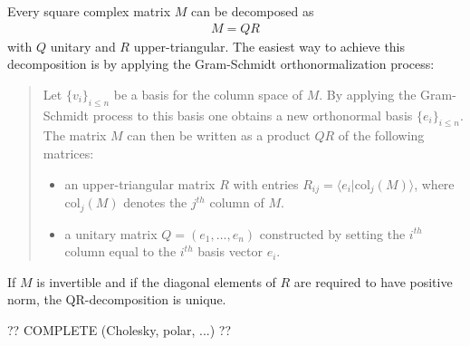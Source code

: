     \begin{method}[QR Decomposition]
        Every square complex matrix $M$ can be decomposed as
        \begin{gather}
            M = QR
        \end{gather}
        with $Q$ unitary and $R$ upper-triangular. The easiest way to achieve this decomposition is by applying the Gram-Schmidt orthonormalization process:
        \begin{quote}
            Let $\{v_i\}_{i\leq n}$ be a basis for the column space of $M$. By applying the Gram-Schmidt process to this basis one obtains a new orthonormal basis $\{e_i\}_{i\leq n}$. The matrix $M$ can then be written as a product $QR$ of the following matrices:
            \begin{itemize}
                \item an upper-triangular matrix $R$ with entries $R_{ij} = \langle e_i|\text{col}_j(M) \rangle$, where $\text{col}_j(M)$ denotes the $j^{th}$ column of $M$.
                \item a unitary matrix $Q = (e_1,\ldots,e_n)$ constructed by setting the $i^{th}$ column equal to the $i^{th}$ basis vector $e_i$.
            \end{itemize}
        \end{quote}
    \end{method}
    \begin{property}
        If $M$ is invertible and if the diagonal elements of $R$ are required to have positive norm, the QR-decomposition is unique.
    \end{property}

    ?? COMPLETE (Cholesky, polar, ...) ??